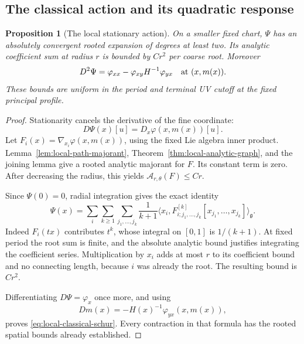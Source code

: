 \documentclass[11pt,reqno]{amsart}
\numberwithin{equation}{section}
\newtheorem{proposition}[theorem]{Proposition}
\theoremstyle{definition}
\theoremstyle{remark}
\newcommand{\g}{\mathfrak g}
\begin{document}
\subsection{The classical action and its quadratic response}

\begin{proposition}[The local stationary action]
\label{prop:local-classical-action}
On a smaller fixed chart, \(\Psi\) has an absolutely
convergent rooted expansion of degrees at least two.
Its analytic coefficient sum at radius \(r\) is
bounded by \(Cr^2\) per coarse root.
Moreover
\begin{equation}
 D^2\Psi
       =\varphi_{xx}
          -\varphi_{xy}H^{-1}\varphi_{yx}
                     \quad\hbox{at }(x,m(x)).
 \label{eq:local-classical-schur}
\end{equation}
These bounds are uniform in the period and terminal
UV cutoff at the fixed principal profile.
\end{proposition}
\begin{proof}
Stationarity cancels the derivative of the fine
coordinate:
\[
       D\Psi(x)[u]=
             D_x\varphi(x,m(x))[u].
\]
Let \(F_i(x)=\nabla_{x_i}\varphi(x,m(x))\),
using the fixed Lie algebra inner product.
Lemma~\ref{lem:local-path-majorant},
Theorem~\ref{thm:local-analytic-graph}, and the
joining lemma give a rooted analytic majorant
for \(F\). Its constant term is zero.
After decreasing the radius, this yields
\(\mathcal A_{r,\theta}(F)\le Cr\).

Since \(\Psi(0)=0\), radial integration gives the
exact identity
\begin{equation}
 \Psi(x)=\sum_i\sum_{k\ge1}
       \sum_{j_1,\ldots,j_k}\frac1{k+1}
       \big\langle x_i,
          F^{[k]}_{i;j_1,\ldots,j_k}
                        [x_{j_1},\ldots,x_{j_k}]
       \big\rangle_{\g}.
 \label{eq:local-classical-radial}
\end{equation}
Indeed \(F_i(tx)\) contributes \(t^k\), whose
integral on \([0,1]\) is \(1/(k+1)\).
At fixed period the root sum is finite, and the
absolute analytic bound justifies integrating
the coefficient series.
Multiplication by \(x_i\) adds at most \(r\)
to its coefficient bound and no connecting length,
because \(i\) was already the root.
The resulting bound is \(Cr^2\).

Differentiating \(D\Psi=\varphi_x\) once more,
and using
\[
             Dm(x)
                =-H(x)^{-1}
                               \varphi_{yx}(x,m(x)),
\]
proves \eqref{eq:local-classical-schur}.
Every contraction in that formula has the rooted
spatial bounds already established.
\end{proof}
\end{document}
